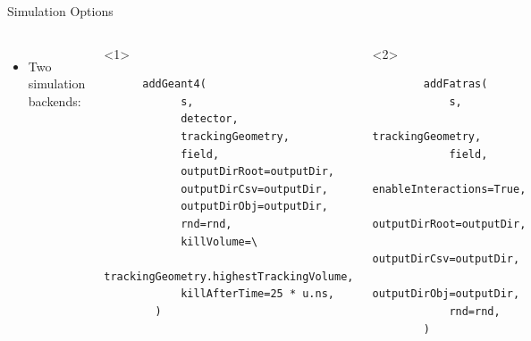 \documentclass[lualatex,aspectratio=169,t,13pt,dvipsnames]{beamer}
\begin{document}
\begin{frame}[fragile]{Simulation Options}

  \begin{columns}[T]
    \begin{itemize}
      \item Two simulation backends:
      \begin{itemize}
      \end{itemize}
    \end{itemize}

    \vspace*{-2em}

    \begin{onlyenv}<1>
    \begin{verbatim}
      addGeant4(
            s,
            detector,
            trackingGeometry,
            field,
            outputDirRoot=outputDir,
            outputDirCsv=outputDir,
            outputDirObj=outputDir,
            rnd=rnd,
            killVolume=\
              trackingGeometry.highestTrackingVolume,
            killAfterTime=25 * u.ns,
        )
    \end{verbatim}
    \end{onlyenv}

    \begin{onlyenv}<2>
    \begin{verbatim}
        addFatras(
            s,
            trackingGeometry,
            field,
            enableInteractions=True,
            outputDirRoot=outputDir,
            outputDirCsv=outputDir,
            outputDirObj=outputDir,
            rnd=rnd,
        )
    \end{verbatim}
    \end{onlyenv}

  \end{columns}
\end{frame}
\end{document}
